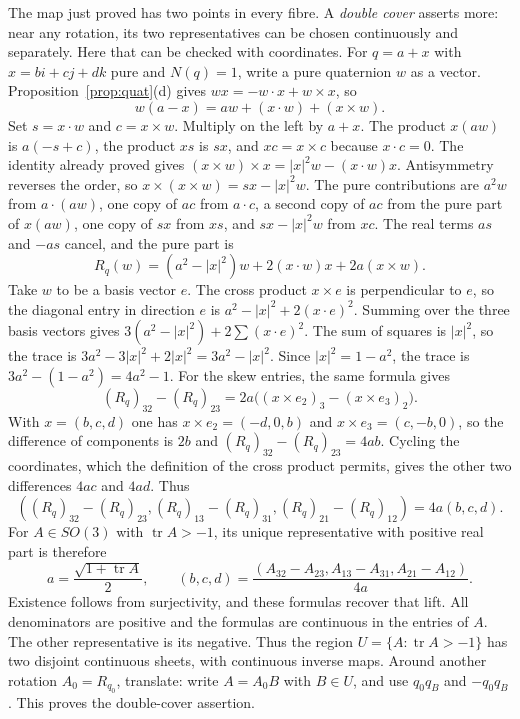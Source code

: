 The map just proved has two points in every fibre. A \emph{double cover}
asserts more: near any rotation, its two representatives can be chosen
continuously and separately. Here that can be checked with coordinates.
For $q=a+x$ with $x=bi+cj+dk$ pure and $N(q)=1$, write a pure quaternion $w$ as a vector. Proposition~\ref{prop:quat}(d) gives $wx=-w\cdot x+w\times x$, so
\[
w(a-x)=aw+(x\cdot w)+(x\times w).
\]
Set $s=x\cdot w$ and $c=x\times w$. Multiply on the left by $a+x$. The product $x(aw)$ is $a(-s+c)$, the product $xs$ is $sx$, and $xc=x\times c$ because $x\cdot c=0$. The identity already proved gives $(x\times w)\times x=|x|^2w-(x\cdot w)x$. Antisymmetry reverses the order, so $x\times(x\times w)=sx-|x|^2w$. The pure contributions are $a^2w$ from $a\cdot(aw)$, one copy of $ac$ from $a\cdot c$, a second copy of $ac$ from the pure part of $x(aw)$, one copy of $sx$ from $xs$, and $sx-|x|^2w$ from $xc$. The real terms $as$ and $-as$ cancel, and the pure part is
\[
R_q(w)=(a^2-|x|^2)w+2(x\cdot w)x+2a(x\times w).
\]
Take $w$ to be a basis vector $e$. The cross product $x\times e$ is perpendicular to $e$, so the diagonal entry in direction $e$ is $a^2-|x|^2+2(x\cdot e)^2$. Summing over the three basis vectors gives $3(a^2-|x|^2)+2\sum(x\cdot e)^2$. The sum of squares is $|x|^2$, so the trace is $3a^2-3|x|^2+2|x|^2=3a^2-|x|^2$. Since $|x|^2=1-a^2$, the trace is $3a^2-(1-a^2)=4a^2-1$. For the skew entries, the same formula gives
\[
(R_q)_{32}-(R_q)_{23}=2a\bigl((x\times e_2)_3-(x\times e_3)_2\bigr).
\]
With $x=(b,c,d)$ one has $x\times e_2=(-d,0,b)$ and $x\times e_3=(c,-b,0)$, so the difference of components is $2b$ and $(R_q)_{32}-(R_q)_{23}=4ab$. Cycling the coordinates, which the definition of the cross product permits, gives the other two differences $4ac$ and $4ad$. Thus
\[
((R_q)_{32}-(R_q)_{23},(R_q)_{13}-(R_q)_{31},
 (R_q)_{21}-(R_q)_{12})=4a(b,c,d).
\]
For $A\in SO(3)$ with $\operatorname{tr}A>-1$, its unique representative
with positive real part is therefore
\[
a=\frac{\sqrt{1+\operatorname{tr}A}}2,
\qquad
(b,c,d)=\frac{(A_{32}-A_{23},A_{13}-A_{31},A_{21}-A_{12})}{4a}.
\]
Existence follows from surjectivity, and these formulas recover that lift.
All denominators are positive and the formulas are continuous in the entries
of $A$. The other representative is its negative. Thus the region
$U=\{A:\operatorname{tr}A>-1\}$ has two disjoint continuous sheets, with
continuous inverse maps. Around another rotation $A_0=R_{q_0}$, translate:
write $A=A_0B$ with $B\in U$, and use $q_0q_B$ and $-q_0q_B$.
This proves the double-cover assertion.

